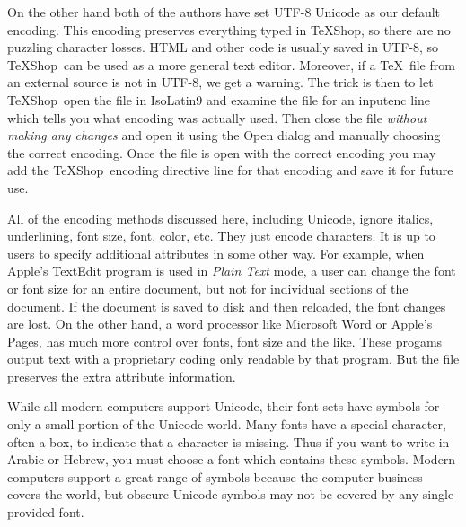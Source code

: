 \documentclass[letterpaper,11pt]{article}
\newcommand{\TS}{\textsf{\TeX Shop}}
\newcommand{\acr}[1]{\textsf{#1}}
\newcommand{\cmd}[1]{\textsf{#1}}
\begin{document}
On the other hand both of the authors have set \acr{UTF-8 Unicode} as our default encoding.
This encoding preserves everything typed in \TS, so there are no puzzling character losses. HTML and other code is usually saved in UTF-8, so \TS\ can be used as a more general text editor. Moreover, if a \TeX\ file from an external source is not in UTF-8, we get a warning.
The trick is then to let \TS\ open the file in \acr{IsoLatin9} and examine the file for an \cmd{inputenc} line which tells you what encoding was actually used. Then close the file \emph{without making any changes} and open it using the \cmd{Open} dialog and manually choosing the correct encoding. Once the file is open with the correct encoding you may add the \TS\ encoding directive line for that encoding and save it for future use.

All of the encoding methods discussed here, including \cmd{Unicode}, ignore italics, underlining,
font size, font, color, etc. They just encode characters. It is up to users to specify
additional attributes in some other way. For example, when Apple's \cmd{TextEdit} program
is used in \emph{Plain Text} mode, a user can change the font or font size for an entire document, but not for individual sections of the document. If the document is saved to disk and then reloaded, the font changes are lost. On the other hand, a word
processor like Microsoft Word or Apple's Pages, has much more control over fonts, font size and the like. These progams output text with a proprietary coding only readable by that program. But the file preserves the extra attribute information.  

While all modern computers support \cmd{Unicode}, their font sets have symbols for only a small portion of the Unicode world. Many fonts have a special character, often a box, to
indicate that a character is missing. Thus if you want to write in Arabic or Hebrew, you must choose a font which contains these symbols. Modern computers support a great range of symbols because the computer business covers the world, but obscure Unicode symbols may not be covered by any single provided font.

%
\end{document}
